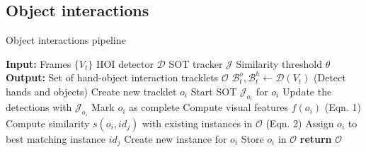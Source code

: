 \subsection{Object interactions}
\begin{algorithm}[H]
\caption{Object interactions pipeline}
\begin{algorithmic}[1]
\State \textbf{Input:}
\State \quad Frames $\{V_t\}$
\State \quad HOI detector $\mathcal{D}$
\State \quad SOT tracker $\mathcal{J}$
\State \quad Similarity threshold $\theta$
\State \textbf{Output:}
\State \quad Set of hand-object interaction tracklets $\mathcal{O}$
\State \quad $\mathcal{B}_t^o, \mathcal{B}_t^h \gets \mathcal{D}(V_t)$ (Detect hands and objects)
\State \quad \quad Create new tracklet $o_i$
\State \quad \quad Start SOT $\mathcal{J}_{o_i}$ for $o_i$
\EndIf
\EndFor
{}
\State \quad Update the detections with $\mathcal{J}_{o_i}$
\State \quad \quad Mark $o_i$ as complete
\EndIf
\EndFor
\EndFor
{}
\State \quad Compute visual features $f(o_i)$ (Eqn. 1)
\State \quad Compute similarity $s(o_i, id_j)$ with existing instances in $\mathcal{O}$ (Eqn. 2)
\State \quad \quad Assign $o_i$ to best matching instance $id_j$
\Else
\State \quad \quad Create new instance for $o_i$
\EndIf
\State \quad Store $o_i$ in $\mathcal{O}$
\EndFor
\State \textbf{return} $\mathcal{O}$
\end{algorithmic}
\end{algorithm}

